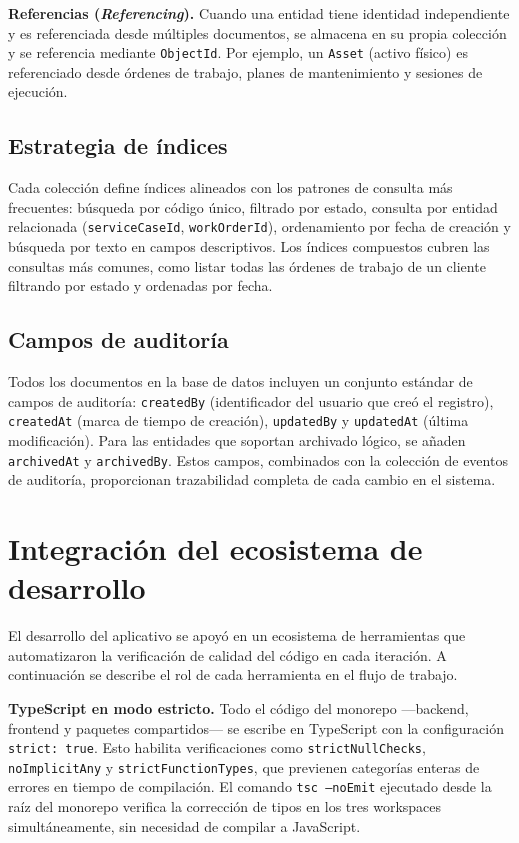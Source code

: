 \textbf{Referencias (\textit{Referencing}).} Cuando una entidad tiene identidad independiente y es referenciada desde múltiples documentos, se almacena en su propia colección y se referencia mediante \texttt{ObjectId}. Por ejemplo, un \texttt{Asset} (activo físico) es referenciado desde órdenes de trabajo, planes de mantenimiento y sesiones de ejecución.

\subsection{Estrategia de índices}

Cada colección define índices alineados con los patrones de consulta más frecuentes: búsqueda por código único, filtrado por estado, consulta por entidad relacionada (\texttt{serviceCaseId}, \texttt{workOrderId}), ordenamiento por fecha de creación y búsqueda por texto en campos descriptivos. Los índices compuestos cubren las consultas más comunes, como listar todas las órdenes de trabajo de un cliente filtrando por estado y ordenadas por fecha.

\subsection{Campos de auditoría}

Todos los documentos en la base de datos incluyen un conjunto estándar de campos de auditoría: \texttt{createdBy} (identificador del usuario que creó el registro), \texttt{createdAt} (marca de tiempo de creación), \texttt{updatedBy} y \texttt{updatedAt} (última modificación). Para las entidades que soportan archivado lógico, se añaden \texttt{archivedAt} y \texttt{archivedBy}. Estos campos, combinados con la colección de eventos de auditoría, proporcionan trazabilidad completa de cada cambio en el sistema.

\section{Integración del ecosistema de desarrollo}
\label{sec:ecosistema-desarrollo}

El desarrollo del aplicativo se apoyó en un ecosistema de herramientas que automatizaron la verificación de calidad del código en cada iteración. A continuación se describe el rol de cada herramienta en el flujo de trabajo.

\textbf{TypeScript en modo estricto.} Todo el código del monorepo —backend, frontend y paquetes compartidos— se escribe en TypeScript con la configuración \texttt{strict: true}. Esto habilita verificaciones como \texttt{strictNullChecks}, \texttt{noImplicitAny} y \texttt{strictFunctionTypes}, que previenen categorías enteras de errores en tiempo de compilación. El comando \texttt{tsc --noEmit} ejecutado desde la raíz del monorepo verifica la corrección de tipos en los tres workspaces simultáneamente, sin necesidad de compilar a JavaScript.

